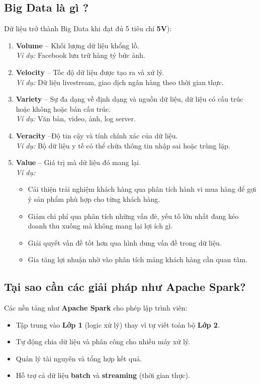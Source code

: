 \documentclass[11pt]{article}
\begin{document}

\subsection{Big Data là gì ?}
Dữ liệu trở thành Big Data khi đạt đủ 5 tiêu chí \textbf{5V}):
\begin{enumerate}
    \item \textbf{Volume} -- Khối lượng dữ liệu khổng lồ. \\
    \textit{Ví dụ:} Facebook lưu trữ hàng tỷ bức ảnh.
    \item \textbf{Velocity} -- Tốc độ dữ liệu được tạo ra và xử lý. \\
    \textit{Ví dụ:} Dữ liệu livestream, giao dịch ngân hàng theo thời gian thực.
    \item \textbf{Variety} -- Sự đa dạng về định dạng và nguồn dữ liệu, dữ liệu có cấu trúc hoặc không hoặc bán cấu trúc. \\
    \textit{Ví dụ:} Văn bản, video, ảnh, log server.
    \item \textbf{Veracity} --Độ tin cậy và tính chính xác của dữ liệu. \\
	\textit{Ví dụ:} Bộ dữ liệu y tế có thể chứa thông tin nhập sai hoặc trùng lặp.

    \item \textbf{Value} -- Giá trị mà dữ liệu đó mang lại. \\
    \textit{Ví dụ:}
	\begin{itemize}
		\item Cải thiện trải nghiệm khách hàng qua phân tích hành vi mua hàng để gợi ý sản phẩm phù hợp cho từng khách hàng.
		\item Giảm chi phí qua phân tích những vấn đè, yếu tố lớn nhất đang kéo doanh thu xuống mà không mang lại lợi ích gì.
		\item Giải quyết vấn đề tốt hơn qua hình dung vấn đề trong dữ liệu.
		\item Gia tăng lợi nhuận nhờ vào phân tích mảng khách hàng cần quan tâm.
	\end{itemize}

\end{enumerate}

\subsection{Tại sao cần các giải pháp như Apache Spark?}
Các nền tảng như \textbf{Apache Spark} cho phép lập trình viên:
\begin{itemize}
    \item Tập trung vào \textbf{Lớp 1} (logic xử lý) thay vì tự viết toàn bộ \textbf{Lớp 2}.
    \item Tự động chia dữ liệu và phân công cho nhiều máy xử lý.
    \item Quản lý tài nguyên và tổng hợp kết quả.
    \item Hỗ trợ cả dữ liệu \textbf{batch} và \textbf{streaming} (thời gian thực).
\end{itemize}
\end{document}
